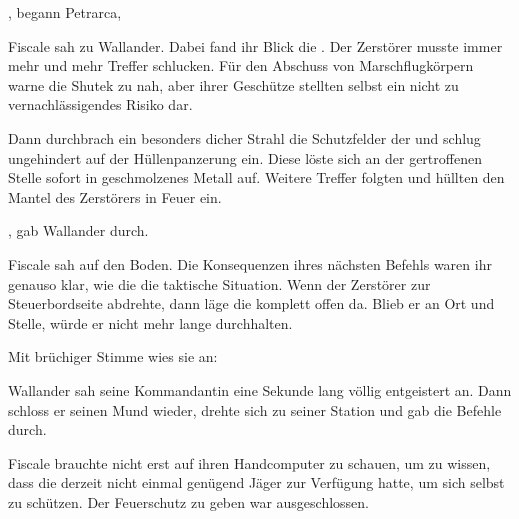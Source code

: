 , begann Petrarca, 

\par

Fiscale sah zu Wallander. Dabei fand ihr Blick die . Der Zerstörer musste immer mehr und mehr Treffer schlucken. Für den Abschuss von Marschflugkörpern warne die Shutek zu nah, aber ihrer Geschütze stellten selbst ein nicht zu vernachlässigendes Risiko dar.

\par

Dann durchbrach ein besonders dicher Strahl die Schutzfelder der  und schlug ungehindert auf der Hüllenpanzerung ein. Diese löste sich an der gertroffenen Stelle sofort in geschmolzenes Metall auf. Weitere Treffer folgten und hüllten den Mantel des Zerstörers in Feuer ein.

\par

, gab Wallander durch. 

\par

Fiscale sah auf den Boden. Die Konsequenzen ihres nächsten Befehls waren ihr genauso klar, wie die die taktische Situation. Wenn der Zerstörer zur Steuerbordseite abdrehte, dann läge die  komplett offen da. Blieb er an Ort und Stelle, würde er nicht mehr lange durchhalten.

\par

Mit brüchiger Stimme wies sie an: 

\par

Wallander sah seine Kommandantin eine Sekunde lang völlig entgeistert an. Dann schloss er seinen Mund wieder, drehte sich zu seiner Station und gab die Befehle durch.

\par

Fiscale brauchte nicht erst auf ihren Handcomputer zu schauen, um zu wissen, dass die  derzeit nicht einmal genügend Jäger zur Verfügung hatte, um sich selbst zu schützen. Der  Feuerschutz zu geben war ausgeschlossen.

